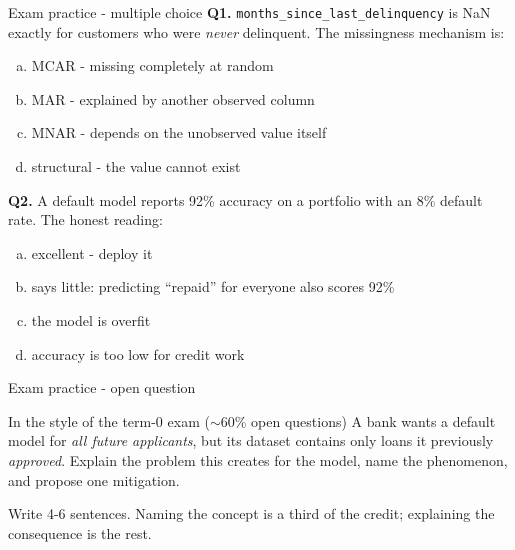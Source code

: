 \documentclass[10pt,aspectratio=169]{beamer}
\begin{document}
\begin{frame}{Exam practice - multiple choice}
  \small
  \textbf{Q1.} \texttt{months\_since\_last\_delinquency} is NaN exactly for
  customers who were \emph{never} delinquent. The missingness mechanism is:
  \begin{enumerate}[(a)]
    \item MCAR - missing completely at random
    \item MAR - explained by another observed column
    \item MNAR - depends on the unobserved value itself
    \item structural - the value cannot exist
  \end{enumerate}
  \vspace{0.4em}
  \textbf{Q2.} A default model reports 92\% accuracy on a portfolio with an
  8\% default rate. The honest reading:
  \begin{enumerate}[(a)]
    \item excellent - deploy it
    \item says little: predicting ``repaid'' for everyone also scores 92\%
    \item the model is overfit
    \item accuracy is too low for credit work
  \end{enumerate}
\end{frame}

\begin{frame}{Exam practice - open question}
  \begin{block}{In the style of the term-0 exam ($\sim$60\% open questions)}
    A bank wants a default model for \emph{all future applicants}, but its
    dataset contains only loans it previously \emph{approved}. Explain the
    problem this creates for the model, name the phenomenon, and propose one
    mitigation.
  \end{block}
  \vspace{0.5em}
  \begin{center}\small
    Write 4-6 sentences. Naming the concept is a third of the credit;
    explaining the consequence is the rest.
  \end{center}
\end{frame}
\end{document}

